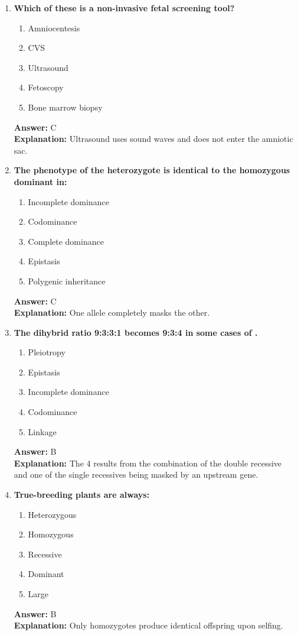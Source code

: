\documentclass[11pt, a4paper]{article}
\begin{document}
\begin{enumerate}[leftmargin=*, label=\arabic*.]
\item \textbf{Which of these is a non-invasive fetal screening tool?}
\begin{enumerate}[label=\Alph*.]
\item Amniocentesis
\item CVS
\item Ultrasound
\item Fetoscopy
\item Bone marrow biopsy
\end{enumerate}
\textbf{Answer:} C \\
\textbf{Explanation:} Ultrasound uses sound waves and does not enter the amniotic sac.

\item \textbf{The phenotype of the heterozygote is identical to the homozygous dominant in:}
\begin{enumerate}[label=\Alph*.]
\item Incomplete dominance
\item Codominance
\item Complete dominance
\item Epistasis
\item Polygenic inheritance
\end{enumerate}
\textbf{Answer:} C \\
\textbf{Explanation:} One allele completely masks the other.

\item \textbf{The dihybrid ratio 9:3:3:1 becomes 9:3:4 in some cases of \underline{\hspace{1cm}}.}
\begin{enumerate}[label=\Alph*.]
\item Pleiotropy
\item Epistasis
\item Incomplete dominance
\item Codominance
\item Linkage
\end{enumerate}
\textbf{Answer:} B \\
\textbf{Explanation:} The 4 results from the combination of the double recessive and one of the single recessives being masked by an upstream gene.

\item \textbf{True-breeding plants are always:}
\begin{enumerate}[label=\Alph*.]
\item Heterozygous
\item Homozygous
\item Recessive
\item Dominant
\item Large
\end{enumerate}
\textbf{Answer:} B \\
\textbf{Explanation:} Only homozygotes produce identical offspring upon selfing.


\end{enumerate}
\end{document}
